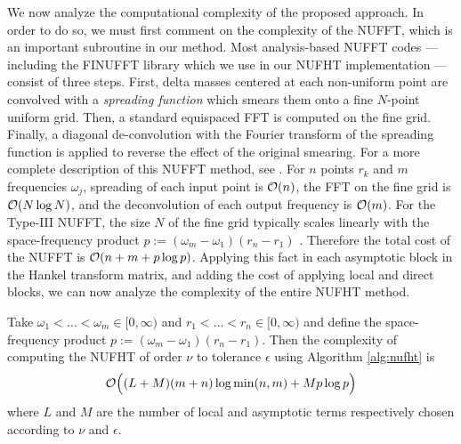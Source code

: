 We now analyze the computational complexity of the proposed approach. In order
to do so, we must first comment on the complexity of the NUFFT, which is an
important subroutine in our method. Most analysis-based NUFFT codes ---
including the FINUFFT library \cite{barnett2019parallel} which we use in our
NUFHT implementation --- consist of three steps. First, delta masses centered at
each non-uniform point are convolved with a \textit{spreading function} which
smears them onto a fine $N$-point uniform grid. Then, a standard equispaced FFT
is computed on the fine grid. Finally, a diagonal de-convolution with the
Fourier transform of the spreading function is applied to reverse the effect of
the original smearing. For a more complete description of this NUFFT method, see
\cite{dutt1993fast,greengard2004accelerating,barnett2019parallel}. For $n$
points $r_k$ and $m$ frequencies $\omega_j$, spreading of each input point is
$\mathcal{O}(n)$, the FFT on the fine grid is $\mathcal{O}(N\log N)$, and the deconvolution of
each output frequency is $\mathcal{O}(m)$. For the Type-III NUFFT, the size $N$ of the
fine grid typically scales linearly with the space-frequency product $p :=
(\omega_m - \omega_1)(r_n - r_1)$ \cite{barnett2019parallel,
greengard2004accelerating}. Therefore the total cost of the NUFFT is $\mathcal{O}(n + m
+ p\log p)$. Applying this fact in each asymptotic block in the Hankel transform
matrix, and adding the cost of applying local and direct blocks, we can now
analyze the complexity of the entire NUFHT method.

\begin{theorem} \label{thm:complexity} Take $\omega_1 < \dots < \omega_m \in
    [0,\infty)$ and $r_1 < \dots < r_n \in [0,\infty)$ and define the
    space-frequency product $p := (\omega_m - \omega_1)(r_n - r_1)$. Then the
    complexity of computing the NUFHT of order $\nu$ to tolerance $\epsilon$
    using Algorithm \ref{alg:nufht} is 
    $$\mathcal{O}\Big((L + M)(m + n) \log \min(n,m) + Mp\log p\Big)$$ where $L$ and $M$
    are the number of local and asymptotic terms respectively chosen according
    to $\nu$ and $\epsilon$.
\end{theorem}

